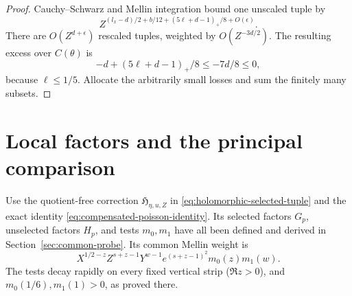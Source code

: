 \documentclass[12pt]{article}
\begin{document}
\begin{proof}
Cauchy--Schwarz and Mellin integration bound one unscaled tuple by
\[
 Z^{(l_x-d)/2+b/12+(5\ell+d-1)_+/8+O(\epsilon)}.
\]
There are \(O(Z^{d+\epsilon})\) rescaled tuples, weighted by
\(O(Z^{-3d/2})\).  The resulting excess over
\(C(\theta)\) is
\[
 -d+(5\ell+d-1)_+/8\le-7d/8\le0,
\]
because \(\ell\le1/5\).  Allocate the arbitrarily small losses
and sum the finitely many subsets.
\end{proof}

\section{Local factors and the principal comparison}\label{sec:principal}
Use the quotient-free correction
\(\mathfrak H_{\eta,u,Z}\) in \eqref{eq:holomorphic-selected-tuple}
and the exact identity \eqref{eq:compensated-poisson-identity}.
Its selected factors \(G_p\), unselected factors \(H_p\), and
tests \(m_0,m_1\) have all been defined and derived in
Section~\ref{sec:common-probe}.  Its common Mellin weight is
\[
 X^{1/2-z}Z^{s+z-1}Y^{w-1}
 e^{(s+z-1)^2}m_0(z)m_1(w).
\]
The tests decay rapidly on every fixed vertical strip
(\(\Re z>0\)), and \(m_0(1/6),m_1(1)>0\), as proved there.
\end{document}
